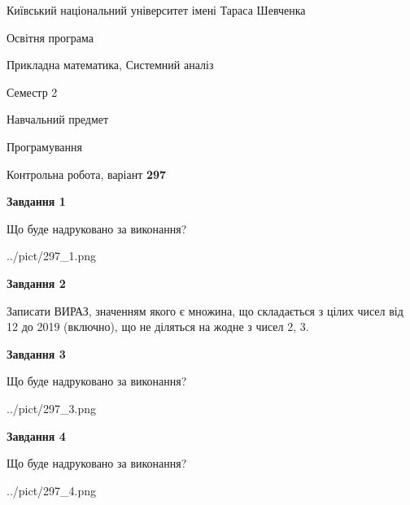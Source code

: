 \documentclass[12pt, ukrainian]{article}
\begin{document}
{{\begin {small}\par
{ \center  Київський національний університет імені Тараса Шевченка \par}
{\parbox {5 cm}{Освітня програма \hfill}{\parbox {8 cm}{Прикладна математика, Системний аналіз \hfill}}\parbox {5 cm}{\hfill Семестр 2}}\par
{\parbox {5 cm} {Навчальний предмет \hfill}\parbox {7 cm}{Програмування \hfill}\parbox {6cm}{\hfill}\par}\vspace{-7pt} \end{small}}{\center Контрольна робота, варіант  \No \textbf
{ 297 }\par}}
{
\begin {large}
{\begin {center}\textbf{Завдання 1}\end {center}}\par
Що буде надруковано за виконання?\par\par
\begin{center}
	{../pict/297_1.png}
\end{center}
\newpage

{\begin {center}\textbf{Завдання 2}\end {center}}\par
Записати ВИРАЗ, значенням якого є множина, що складається з цілих чисел від 12 до 2019 (включно), що не діляться на жодне з чисел 2, 3.\par
\newpage

{\begin {center}\textbf{Завдання 3}\end {center}}\par
Що буде надруковано за виконання?
\begin{center}
	{../pict/297_3.png}
\end{center}
\newpage

{\begin {center}\textbf{Завдання 4}\end {center}}\par
Що буде надруковано за виконання?\par
\begin{center}
	{../pict/297_4.png}
\end{center}
\newpage


\end{large}}
\end{document}
